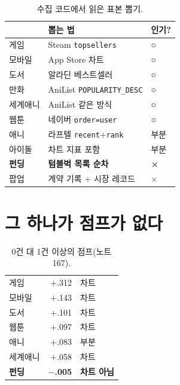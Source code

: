\documentclass[10pt]{article}
\begin{document}
\begin{table}[t]
\centering\tsize
\caption{수집 코드에서 읽은 표본 뽑기.}
\begin{tabular}{lll}
\toprule
& 뽑는 법 & 인기? \\
\midrule
게임 & Steam \texttt{topsellers} & ○ \\
모바일 & App Store 차트 & ○ \\
도서 & 알라딘 베스트셀러 & ○ \\
만화 & AniList \texttt{POPULARITY\_DESC} & ○ \\
세계애니 & AniList 같은 방식 & ○ \\
웹툰 & 네이버 \texttt{order=user} & ○ \\
애니 & 라프텔 \texttt{recent}$+$\texttt{rank} & 부분 \\
아이돌 & 차트 지표 포함 & 부분 \\
\textbf{펀딩} & \textbf{텀블벅 목록 순차} & \textbf{×} \\
팝업 & 계약 기록 $+$ 시장 레코드 & × \\
\bottomrule
\end{tabular}
\end{table}


\section{그 하나가 점프가 없다}

\begin{table}[t]
\centering\tsize
\caption{0건 대 1건 이상의 점프(노트 167).}
\begin{tabular}{lrl}
\toprule
게임 & $+$.312 & 차트 \\
모바일 & $+$.143 & 차트 \\
도서 & $+$.101 & 차트 \\
웹툰 & $+$.097 & 차트 \\
애니 & $+$.083 & 부분 \\
세계애니 & $+$.058 & 차트 \\
\midrule
\textbf{펀딩} & \textbf{$-$.005} & \textbf{차트 아님} \\
\bottomrule
\end{tabular}
\end{table}
\end{document}
